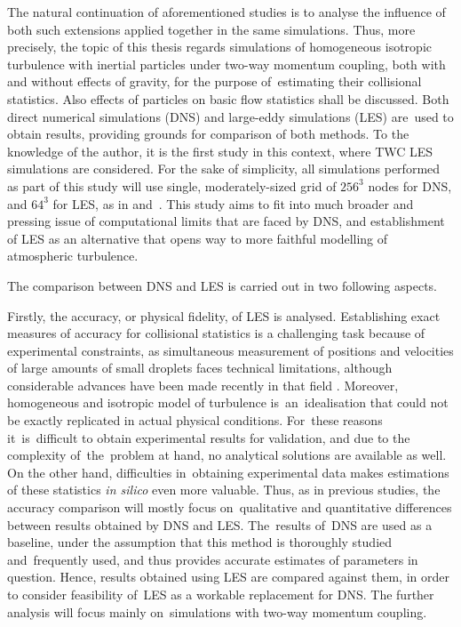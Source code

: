\documentclass{pracamgren}
\begin{document}
\smallskip

The natural continuation of aforementioned studies is to analyse the influence of both such extensions applied together in the same simulations.
Thus, more precisely, the topic of this thesis regards simulations of homogeneous isotropic turbulence with inertial particles under two-way momentum coupling, both with and without effects of gravity, for the purpose of~estimating their collisional statistics.
Also effects of particles on basic flow statistics shall be discussed.
Both direct numerical simulations (DNS) and large-eddy simulations (LES) are~used to obtain results, providing grounds for comparison of both methods.
To the knowledge of the author, it is the first study in this context, where TWC LES simulations are considered.
For the sake of simplicity, all simulations performed as part of this study will use single, moderately-sized grid of $256^3$ nodes for DNS, and $64^3$ for LES, as in \textcite{Jin2010} and~\textcite{Rosa2017}.
This study aims to fit into much broader and pressing issue of computational limits that are faced by DNS, and establishment of LES as an alternative that opens way to more faithful modelling of atmospheric turbulence.

\smallskip

The comparison between DNS and LES is carried out in two following aspects.

Firstly, the accuracy, or physical fidelity, of LES is analysed.
Establishing exact measures of accuracy for collisional statistics is a challenging task because of experimental constraints, as simultaneous measurement of positions and velocities of large amounts of small droplets faces technical limitations, although considerable advances have been made recently in that field \parencite{Yavuz2018}.
Moreover, homogeneous and isotropic model of turbulence is~an~idealisation that could not be exactly replicated in actual physical conditions.
For~these reasons it~is~difficult to obtain experimental results for validation, and due to the complexity of~the~problem at hand, no analytical solutions are available as well.
On the other hand, difficulties in~obtaining experimental data makes estimations of these statistics \emph{in silico} even more valuable.
Thus, as in previous studies, the accuracy comparison will mostly focus on~qualitative and quantitative differences between results obtained by DNS and LES.
The~results of~DNS are used as a baseline, under the assumption that this method is thoroughly studied and~frequently used, and thus provides accurate estimates of parameters in question.
Hence, results obtained using LES are compared against them, in order to consider feasibility of~LES as a workable replacement for DNS.
The further analysis will focus mainly on~simulations with two-way momentum coupling.
\end{document}

